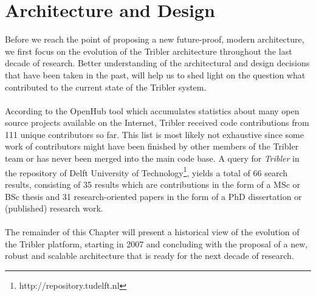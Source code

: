 \chapter{Architecture and Design}
\label{chapter:architecture}

Before we reach the point of proposing a new future-proof, modern architecture, we first focus on the evolution of the Tribler architecture throughout the last decade of research. Better understanding of the architectural and design decisions that have been taken in the past, will help us to shed light on the question what contributed to the current state of the Tribler system.\\\\
According to the OpenHub tool\cite{openhubtribler} which accumulates statistics about many open source projects available on the Internet, Tribler received code contributions from 111 unique contributors so far. This list is most likely not exhaustive since some work of contributors might have been finished by other members of the Tribler team or has never been merged into the main code base. A query for \emph{Tribler} in the repository of Delft University of Technology\footnote{http://repository.tudelft.nl}, yields a total of 66 search results, consisting of 35 results which are contributions in the form of a MSc or BSc thesis and 31 research-oriented papers in the form of a PhD dissertation or (published) research work.\\\\
The remainder of this Chapter will present a historical view of the evolution of the Tribler platform, starting in 2007 and concluding with the proposal of a new, robust and scalable architecture that is ready for the next decade of research.

